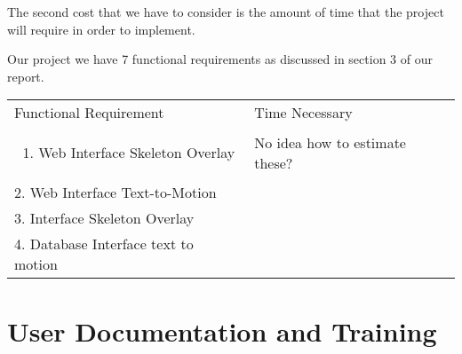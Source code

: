 \documentclass{scrreprt}
\providecommand{\tightlist}{%
  \setlength{\itemsep}{0pt}\setlength{\parskip}{0pt}}
\begin{document}
{The second cost that we have to consider is the amount of time that the
project will require in order to implement. ~}

{Our project we have 7 functional requirements as discussed in section 3
of our report. ~}

\begin{longtable}[c]{@{}ll@{}}
\toprule
\begin{minipage}[t]{0.47\columnwidth}\raggedright\strut
{Functional Requirement}
\strut\end{minipage} &
\begin{minipage}[t]{0.47\columnwidth}\raggedright\strut
{Time Necessary}
\strut\end{minipage}\tabularnewline
\begin{minipage}[t]{0.47\columnwidth}\raggedright\strut
\begin{enumerate}
\tightlist
\item
  {Web Interface Skeleton Overlay}
\end{enumerate}
\strut\end{minipage} &
\begin{minipage}[t]{0.47\columnwidth}\raggedright\strut
{No idea how to estimate these?}
\strut\end{minipage}\tabularnewline
\begin{minipage}[t]{0.47\columnwidth}\raggedright\strut
{2. Web Interface Text-to-Motion}
\strut\end{minipage} &
\begin{minipage}[t]{0.47\columnwidth}\raggedright\strut
{}
\strut\end{minipage}\tabularnewline
\begin{minipage}[t]{0.47\columnwidth}\raggedright\strut
{3. Interface Skeleton Overlay}
\strut\end{minipage} &
\begin{minipage}[t]{0.47\columnwidth}\raggedright\strut
{}
\strut\end{minipage}\tabularnewline
\begin{minipage}[t]{0.47\columnwidth}\raggedright\strut
{4. Database Interface text to motion}
\strut\end{minipage} &
\begin{minipage}[t]{0.47\columnwidth}\raggedright\strut
{}
\strut\end{minipage}\tabularnewline
\bottomrule
\end{longtable}

\section{User Documentation and Training}
\end{document}
